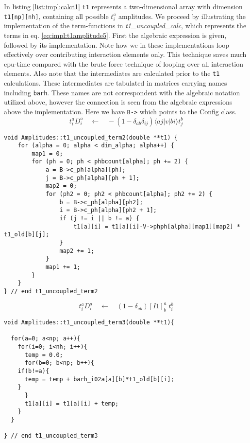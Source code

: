 In listing \ref{list:impl:calct1} \texttt{t1} represents a two-dimensional array with dimension \texttt{t1[np][nh]}, containing all possible $t_i^a$ amplitudes. We proceed by illustrating the implementation of the term-functions in \emph{t1\_uncoupled\_calc}, which represents the terms in eq. \ref{eq:impl:t1amplitude5}. First the algebraic expression is given, followed by its implementation. Note how we in these implementations loop effectively over contributing interaction elements only. This technique saves much cpu-time compared with the brute force technique of looping over all interaction elements. Also note that the intermediates are calculated prior to the \texttt{t1} calculations. These intermediates are tabulated in matrices carrying names including \texttt{barh}. These names are not correspondent with the algebraic notation utilized above, however the connection is seen from the algebraic expressions above the implementation. Here we have \texttt{B->} which points to the Config class.
%
\begin{equation*}
t_i^aD_i^a\quad \leftarrow \quad-(1-\delta_{ab}\delta_{ij})\langle aj|v|bi \rangle t_{j}^{b}
\end{equation*}
%
\begin{lstlisting}[label={list:impl:t1term2},caption={implementation of the amp1 class function t1\_uncoupled\_term2()}]
void Amplitudes::t1_uncoupled_term2(double **t1) {
    for (alpha = 0; alpha < dim_alpha; alpha++) {
        map1 = 0;
        for (ph = 0; ph < phbcount[alpha]; ph += 2) {
            a = B->c_ph[alpha][ph];
            j = B->c_ph[alpha][ph + 1];
            map2 = 0;
            for (ph2 = 0; ph2 < phbcount[alpha]; ph2 += 2) {
                b = B->c_ph[alpha][ph2];
                i = B->c_ph[alpha][ph2 + 1];
                if (j != i || b != a) {
                    t1[a][i] = t1[a][i]-V->phph[alpha][map1][map2] * t1_old[b][j];
                }
                map2 += 1;
            }
            map1 += 1;
        }
    }
} // end t1_uncoupled_term2
\end{lstlisting}
%
\begin{equation*}
t_i^aD_i^a\quad \leftarrow \quad(1-\delta_{ab})[I1]_b^a\phantom{.}t_i^b
\end{equation*}
%
\begin{lstlisting}[label={list:impl:t1term3},caption={implementation of the amp1 class function t1\_uncoupled\_term3()}]
void Amplitudes::t1_uncoupled_term3(double **t1){
  
  for(a=0; a<np; a++){
    for(i=0; i<nh; i++){ 
      temp = 0.0;
      for(b=0; b<np; b++){
	if(b!=a){
	  temp = temp + barh_i02a[a][b]*t1_old[b][i];
	}
      }
      t1[a][i] = t1[a][i] + temp;
    }
  }

} // end t1_uncoupled_term3
\end{lstlisting}
